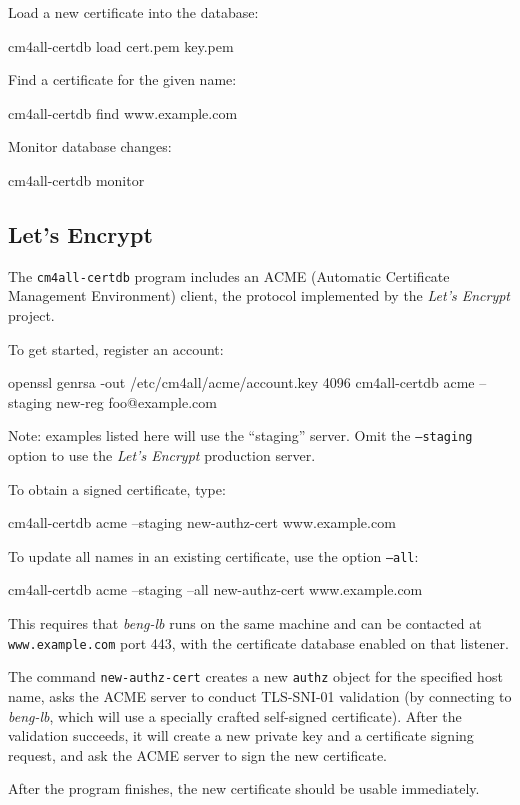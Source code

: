 \documentclass[a4paper,12pt]{article}
\begin{document}
Load a new certificate into the database:

\begin{verbatim*}
cm4all-certdb load cert.pem key.pem
\end{verbatim*}

Find a certificate for the given name:

\begin{verbatim*}
cm4all-certdb find www.example.com
\end{verbatim*}

Monitor database changes:

\begin{verbatim*}
cm4all-certdb monitor
\end{verbatim*}

\subsection{Let's Encrypt}

The \texttt{cm4all-certdb} program includes an ACME (Automatic
Certificate Management Environment) client, the protocol implemented
by the \emph{Let's Encrypt} project.

To get started, register an account:

\begin{verbatim*}
openssl genrsa -out /etc/cm4all/acme/account.key  4096
cm4all-certdb acme --staging new-reg foo@example.com
\end{verbatim*}

\small{Note: examples listed here will use the ``staging'' server.
  Omit the \texttt{--staging} option to use the \emph{Let's Encrypt}
  production server.}

To obtain a signed certificate, type:

\begin{verbatim*}
cm4all-certdb acme --staging new-authz-cert www.example.com
\end{verbatim*}

To update all names in an existing certificate, use the option
\texttt{--all}:

\begin{verbatim*}
cm4all-certdb acme --staging --all new-authz-cert www.example.com
\end{verbatim*}

This requires that \emph{beng-lb} runs on the same machine and can be
contacted at \texttt{www.example.com} port 443, with the certificate
database enabled on that listener.

The command \texttt{new-authz-cert} creates a new \texttt{authz}
object for the specified host name, asks the ACME server to conduct
TLS-SNI-01 validation (by connecting to \emph{beng-lb}, which will use
a specially crafted self-signed certificate).  After the validation
succeeds, it will create a new private key and a certificate signing
request, and ask the ACME server to sign the new certificate.

After the program finishes, the new certificate should be usable
immediately.
\end{document}
